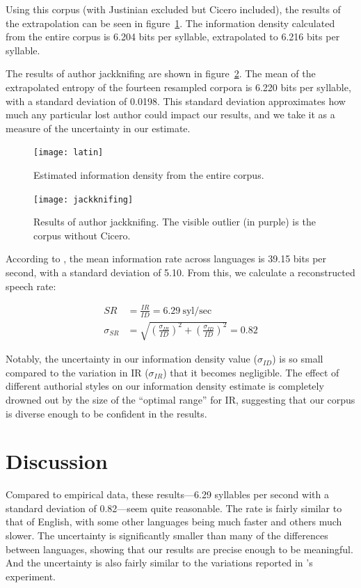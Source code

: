 \documentclass[12pt,twoside]{article}
\begin{document}
Using this corpus (with Justinian excluded but Cicero included), the results of the extrapolation can be seen in figure~\ref{fig:results}. The information density calculated from the entire corpus is 6.204 bits per syllable, extrapolated to 6.216 bits per syllable.

The results of author jackknifing are shown in figure~\ref{fig:jackknifing}. The mean of the extrapolated entropy of the fourteen resampled corpora is 6.220 bits per syllable, with a standard deviation of 0.0198. This standard deviation approximates how much any particular lost author could impact our results, and we take it as a measure of the uncertainty in our estimate.

\begin{figure}[p]
\centering
\caption{Estimated information density from the entire corpus.}
\label{fig:results}
\noindent\texttt{[image: latin]}
\end{figure}

\begin{figure}[p]
\centering
\caption{Results of author jackknifing. The visible outlier (in purple) is the corpus without Cicero.}
\label{fig:jackknifing}
\noindent\texttt{[image: jackknifing]}
\end{figure}

According to \citet{coupé}, the mean information rate across languages is 39.15 bits per second, with a standard deviation of 5.10. From this, we calculate a reconstructed speech rate:

\begin{align}
SR &= \frac{IR}{ID} = 6.29\:\textrm{syl/sec} \\
\sigma_{SR} &= \sqrt{\left(\frac{\sigma_{IR}}{ID}\right)^2 + \left(\frac{\sigma_{ID}}{ID}\right)^2} = 0.82
\end{align}

Notably, the uncertainty in our information density value (\(\sigma_{ID}\)) is so small compared to the variation in IR (\(\sigma_{IR}\)) that it becomes negligible. The effect of different authorial styles on our information density estimate is completely drowned out by the size of the ``optimal range'' for IR, suggesting that our corpus is diverse enough to be confident in the results.

\section{Discussion}
\label{sec:disc}

Compared to  empirical data, these results---6.29 syllables per second with a standard deviation of 0.82---seem quite reasonable. The rate is fairly similar to that of English, with some other languages being much faster and others much slower. The uncertainty is significantly smaller than many of the differences between languages, showing that our results are precise enough to be meaningful. And the uncertainty is also fairly similar to the variations reported in \citeauthor{coupé}'s experiment.
\end{document}
